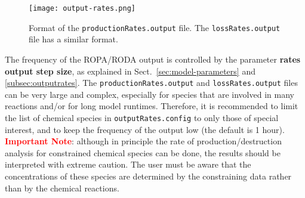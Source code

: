 \begin{figure}[htb]
  \centering
  \texttt{[image: output-rates.png]}
  \caption{Format of the \texttt{productionRates.output} file. The
    \texttt{lossRates.output} file has a similar format.}
  \label{fig:ropa}
\end{figure}

The frequency of the ROPA/RODA output is controlled by the
parameter \textbf{rates output step size}, as explained in
Sect.~\ref{sec:model-parameters} and \ref{subsec:outputrates}. The
\texttt{productionRates.output} and \texttt{lossRates.output} files
can be very large and complex, especially for species that are
involved in many reactions and/or for long model runtimes. Therefore,
it is recommended to limit the list of chemical species in
\texttt{outputRates.config} to only those of special interest, and to
keep the frequency of the output low (the default is 1 hour).\\

\textcolor{red}{\bf Important Note}: although in principle the rate of
production/destruction analysis for constrained chemical species can
be done, the results should be interpreted with extreme caution. The
user must be aware that the concentrations of these species are
determined by the constraining data rather than by the chemical
reactions.
